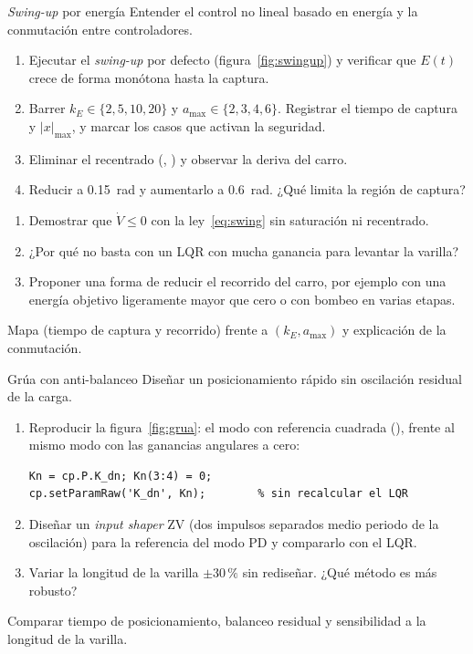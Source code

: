 \begin{practica}{\emph{Swing-up} por energía}
\objetivos Entender el control no lineal basado en energía y la conmutación entre controladores.
\procedimiento
\begin{enumerate}
  \item Ejecutar el \emph{swing-up} por defecto (figura~\ref{fig:swingup}) y verificar que $E(t)$ crece de forma monótona hasta la captura.
  \item Barrer $k_E\in\{2,5,10,20\}$ y $a_{\max}\in\{2,3,4,6\}$. Registrar el tiempo de captura y $|x|_{\max}$, y marcar los casos que activan la seguridad.
  \item Eliminar el recentrado (, ) y observar la deriva del carro.
  \item Reducir  a \SI{0.15}{rad} y aumentarlo a \SI{0.6}{rad}. ¿Qué limita la región de captura?
\end{enumerate}
\preguntas
\begin{enumerate}
  \item Demostrar que $\dot V\le0$ con la ley~\eqref{eq:swing} sin saturación ni recentrado.
  \item ¿Por qué no basta con un LQR con mucha ganancia para levantar la varilla?
  \item Proponer una forma de reducir el recorrido del carro, por ejemplo con una energía objetivo ligeramente mayor que cero o con bombeo en varias etapas.
\end{enumerate}
\entregables Mapa (tiempo de captura y recorrido) frente a $(k_E,a_{\max})$ y explicación de la conmutación.
\end{practica}

\begin{practica}{Grúa con anti-balanceo}
\objetivos Diseñar un posicionamiento rápido sin oscilación residual de la carga.
\procedimiento
\begin{enumerate}
  \item Reproducir la figura~\ref{fig:grua}: el modo  con referencia cuadrada (), frente al mismo modo con las ganancias angulares a cero:
\begin{lstlisting}
Kn = cp.P.K_dn; Kn(3:4) = 0;
cp.setParamRaw('K_dn', Kn);        % sin recalcular el LQR
\end{lstlisting}
  \item Diseñar un \emph{input shaper} ZV (dos impulsos separados medio periodo de la oscilación) para la referencia del modo PD y compararlo con el LQR.
  \item Variar la longitud de la varilla $\pm30\,\%$ sin rediseñar. ¿Qué método es más robusto?
\end{enumerate}
\preguntas Comparar tiempo de posicionamiento, balanceo residual y sensibilidad a la longitud de la varilla.
\end{practica}

